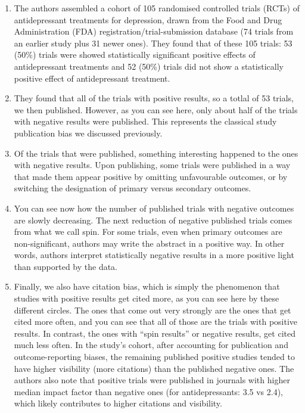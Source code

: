 \documentclass[
  english,
  letterpaper,
  DIV=11,
  numbers=noendperiod]{scrartcl}
\begin{document}
\begin{enumerate}
\def\labelenumi{\alph{enumi})}
\item
  The authors assembled a cohort of 105 randomised controlled trials
  (RCTs) of antidepressant treatments for depression, drawn from the
  Food and Drug Administration (FDA) registration/trial-submission
  database (74 trials from an earlier study plus 31 newer ones). They
  found that of these 105 trials: 53 (50\%) trials were showed
  statistically significant positive effects of antidepressant
  treatments and 52 (50\%) trials did not show a statistically positive
  effect of antidepressant treatment.
\item
  They found that all of the trials with positive results, so a totlal
  of 53 trials, we then published. However, as you can see here, only
  about half of the trials with negative results were published. This
  represents the classical study publication bias we discussed
  previously.
\item
  Of the trials that were published, something interesting happened to
  the ones with negative results. Upon publishing, some trials were
  published in a way that made them appear positive by omitting
  unfavourable outcomes, or by switching the designation of primary
  versus secondary outcomes.
\item
  You can see now how the number of published trials with negative
  outcomes are slowly decreasing. The next reduction of negative
  published trials comes from what we call spin. For some trials, even
  when primary outcomes are non-significant, authors may write the
  abstract in a positive way. In other words, authors interpret
  statistically negative results in a more positive light than supported
  by the data.
\item
  Finally, we also have citation bias, which is simply the phenomenon
  that studies with positive results get cited more, as you can see here
  by these different circles. The ones that come out very strongly are
  the ones that get cited more often, and you can see that all of those
  are the trials with positive results. In contrast, the ones with
  ``spin results'' or negative results, get cited much less often. In
  the study's cohort, after accounting for publication and
  outcome-reporting biases, the remaining published positive studies
  tended to have higher visibility (more citations) than the published
  negative ones. The authors also note that positive trials were
  published in journals with higher median impact factor than negative
  ones (for antidepressants: 3.5 vs 2.4), which likely contributes to
  higher citations and visibility.
\end{enumerate}
\end{document}
